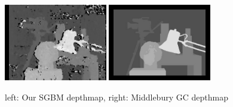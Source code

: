 \documentclass[a4paper]{article}
\begin{document}
\begin{figure} [h!tb]
  \centering
  \includegraphics[width=0.4\textwidth]{sgbm_tsukuba_own}
  \includegraphics[width=0.4\textwidth]{disp_tsukuba_orig}
  \caption{left: Our SGBM depthmap, right: Middlebury GC depthmap}
  \label{sgbm_comp}
\end{figure}
\end{document}
